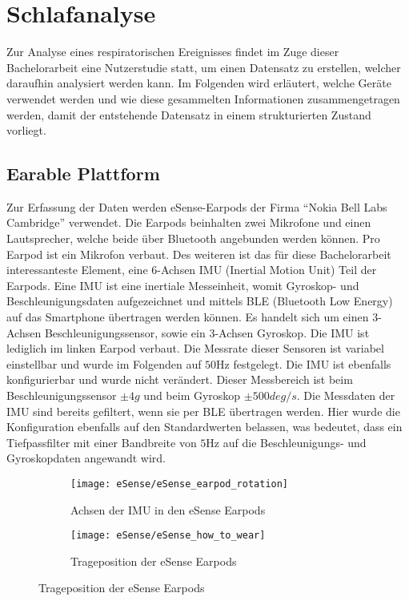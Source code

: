 
\chapter{Schlafanalyse}
\label{ch:sa}
Zur Analyse eines respiratorischen Ereignisses findet im Zuge dieser Bachelorarbeit eine Nutzerstudie statt, um einen Datensatz zu erstellen, welcher daraufhin analysiert werden kann. Im Folgenden wird erläutert, welche Geräte verwendet werden und wie diese gesammelten Informationen zusammengetragen werden, damit der entstehende Datensatz in einem strukturierten Zustand vorliegt.

\section{Earable Plattform}
\label{ch:sa:ep}
Zur Erfassung der Daten werden eSense-Earpods der Firma ``Nokia Bell Labs Cambridge'' verwendet.	
Die Earpods beinhalten zwei Mikrofone und einen Lautsprecher, welche beide über Bluetooth angebunden werden können.
Pro Earpod ist ein Mikrofon verbaut.
Des weiteren ist das für diese Bachelorarbeit interessanteste Element, eine 6-Achsen IMU (Inertial Motion Unit) Teil der Earpods.
Eine IMU ist eine inertiale Messeinheit, womit Gyroskop- und Beschleunigungsdaten aufgezeichnet und mittels BLE (Bluetooth Low Energy) auf das Smartphone übertragen werden können. 
Es handelt sich um einen 3-Achsen Beschleunigungssensor, sowie ein 3-Achsen Gyroskop.
Die IMU ist lediglich im linken Earpod verbaut.
Die Messrate dieser Sensoren ist variabel einstellbar und wurde im Folgenden auf $50 \si{\hertz}$ festgelegt.
Die IMU ist ebenfalls konfigurierbar und wurde nicht verändert. 
Dieser Messbereich ist beim Beschleunigungssensor $\pm 4g$ und beim Gyroskop $\pm 500deg/s$.
Die Messdaten der IMU sind bereits gefiltert, wenn sie per BLE übertragen werden.
Hier wurde die Konfiguration ebenfalls auf den Standardwerten belassen, was bedeutet, dass ein Tiefpassfilter mit einer Bandbreite von $5\si{\hertz}$ auf die Beschleunigungs- und Gyroskopdaten angewandt wird.

\begin{figure}[ht]
    \centering
    \begin{subfigure}{.49\textwidth}
      \texttt{[image: eSense/eSense\_earpod\_rotation]}
      \caption{Achsen der IMU in den eSense Earpods}
      \label{analysis:eSense:rotation}
    \end{subfigure}
    \begin{subfigure}{.49\textwidth}
      \texttt{[image: eSense/eSense\_how\_to\_wear]}
      \caption{Trageposition der eSense Earpods}
      \label{analysis:eSense:how_to_wear}
    \end{subfigure}
    \label{analysis:eSense:images}
  \end{figure}


